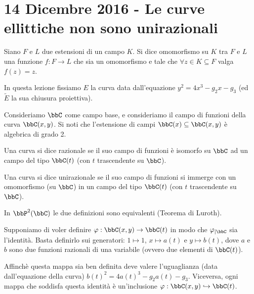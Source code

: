\chapter{14 Dicembre 2016 - Le curve ellittiche non sono unirazionali}
\begin{definizione}
Siano $F$ e $L$ due estensioni di un campo $K$. Si dice omomorfismo su $K$ tra $F$ e $L$ una funzione $f:F\rightarrow L$ che sia un omomorfismo e tale che $\forall z\in K\subseteq F$ valga $f(z)=z$.
\end{definizione}
In questa lezione fissiamo $E$ la curva data dall'equazione $y^2=4x^3-g_2x-g_3$ (ed $\widetilde{E}$ la sua chiusura proiettiva).

Consideriamo $\bbC$ come campo base, e consideriamo il campo di funzioni della curva $\bbC(x,y)$. Si noti che l'estensione di campi $\bbC(x)\subseteq\bbC(x,y)$ è algebrica di grado 2.

\begin{definizione}
Una curva si dice razionale se il suo campo di funzioni è isomorfo su $\bbC$ ad un campo del tipo $\bbC(t)$ (con $t$ trascendente su $\bbC$).
\end{definizione}
\begin{definizione}
Una curva si dice unirazionale se il suo campo di funzioni si immerge con un omomorfismo (su $\bbC$) in un campo del tipo $\bbC(t)$ (con $t$ trascendente su $\bbC$).
\end{definizione}
\begin{osservazione}
In $\bbP^2(\bbC)$ le due definizioni sono equivalenti (Teorema di Luroth).
\end{osservazione}
Supponiamo di voler definire $\varphi: \bbC(x,y) \rightarrow \bbC(t)$ in modo che $\varphi_{|\bbC}$ sia l'identità. Basta definirlo sui generatori: $1\mapsto 1$, $x\mapsto a(t)$ e $y\mapsto b(t)$, dove $a$ e $b$ sono due funzioni razionali di una variabile (ovvero due elementi di $\bbC(t)$).

Affinchè questa mappa sia ben definita deve valere l'uguaglianza (data dall'equazione della curva)   $b(t)^2=4a(t)^3-g_2a(t)-g_3$.
Viceversa, ogni mappa che soddisfa questa identità è un'inclusione $\varphi: \bbC(x,y) \hookrightarrow \bbC(t)$.

